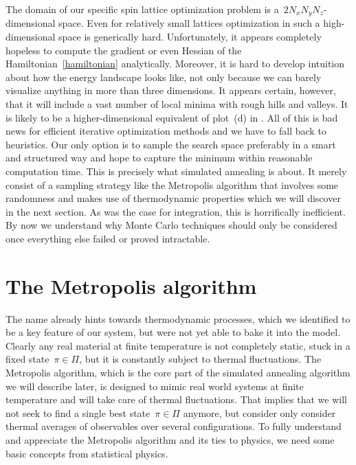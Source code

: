 The domain of our specific spin lattice optimization problem is a~$2 N_x N_y
N_z$-dimensional space. Even for relatively small lattices optimization in such
a high-dimensional space is generically hard. Unfortunately, it appears
completely hopeless to compute the gradient or even Hessian of the
Hamiltonian~\eqref{hamiltonian} analytically. Moreover, it is hard to develop
intuition about how the energy landscape looks like, not only because we can
barely visualize anything in more than three dimensions. It appears certain,
however, that it will include a vast number of local minima with rough hills and
valleys. It is likely to be a higher-dimensional equivalent of plot~(d) in
. All of this is bad news for efficient iterative
optimization methods and we have to fall back to heuristics. Our only option is
to sample the search space preferably in a smart and structured way and hope to
capture the minimum within reasonable computation time. This is precisely what
simulated annealing is about. It merely consist of a sampling strategy like the
Metropolis algorithm that involves some randomness and makes use of
thermodynamic properties which we will discover in the next section. As was the
case for integration, this is horrifically inefficient. By now we understand why
Monte Carlo techniques should only be considered once everything else failed or
proved intractable.
%
\section{The Metropolis algorithm}\label{sec:metropolis}
%
The name  already hints towards thermodynamic
processes, which we identified to be a key feature of our system, but were not
yet able to bake it into the model. Clearly any real material at finite
temperature is not completely static, \ie{} stuck in a fixed state~$\pi \in
\Pi$, but it is constantly subject to thermal fluctuations. The Metropolis
algorithm, which is the core part of the simulated annealing algorithm we will
describe later, is designed to mimic real world systems at finite temperature
and will take care of thermal fluctuations. That implies that we will not seek
to find a single best state~$\pi \in \Pi$ anymore, but consider only consider
thermal averages of observables over several configurations. To fully understand
and appreciate the Metropolis algorithm and its ties to physics, we need some
basic concepts from statistical physics.

